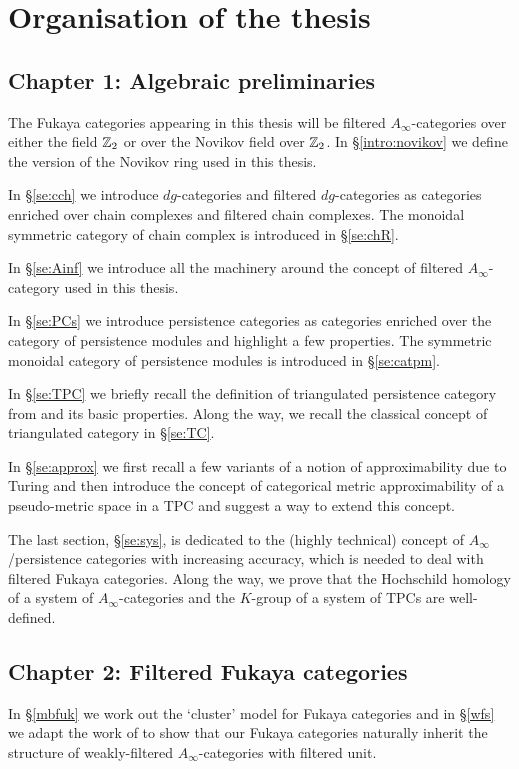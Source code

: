 
\section{Organisation of the thesis}

\subsection*{Chapter 1: Algebraic preliminaries}

The Fukaya categories appearing in this thesis will be filtered $A_\infty$-categories over either the field $\mathbb{Z}_2$ or over the Novikov field over $\mathbb{Z}_2$. In \S\ref{intro:novikov} we define the version of the Novikov ring used in this thesis.

In \S\ref{se:cch} we introduce $dg$-categories and filtered $dg$-categories as categories enriched over chain complexes and filtered chain complexes. The monoidal symmetric category of chain complex is introduced in \S\ref{se:chR}.

In \S\ref{se:Ainf} we introduce all the machinery around the concept of filtered $A_\infty$-category used in this thesis. 

In \S\ref{se:PCs} we introduce persistence categories \cite{BCZ:tpc} as categories enriched over the category of persistence modules and highlight a few properties. The symmetric monoidal category of persistence modules is introduced in \S\ref{se:catpm}.

In \S\ref{se:TPC} we briefly recall the definition of triangulated persistence category from \cite{BCZ:tpc} and its basic properties. Along the way, we recall the classical concept of triangulated category in \S\ref{se:TC}.

In \S\ref{se:approx} we first recall a few variants of a notion of approximability due to Turing \cite{Turing:approx} and then introduce the concept of categorical metric approximability \cite{ABC26} of a pseudo-metric space in a TPC and suggest a way to extend this concept. 

The last section, \S\ref{se:sys}, is dedicated to the (highly technical) concept of $A_\infty$/persistence categories with increasing accuracy, which is needed to deal with filtered Fukaya categories. Along the way, we prove that the Hochschild homology of a system of $A_\infty$-categories and the $K$-group of a system of TPCs are well-defined.

\subsection*{Chapter 2: Filtered Fukaya categories}
In \S \ref{mbfuk} we work out the `cluster' model for Fukaya categories and in \S \ref{wfs} we adapt the work of \cite{Bi-Co-Sh:LagrSh} to show that our Fukaya categories naturally inherit the structure of weakly-filtered $A_\infty$-categories with filtered unit.
 
